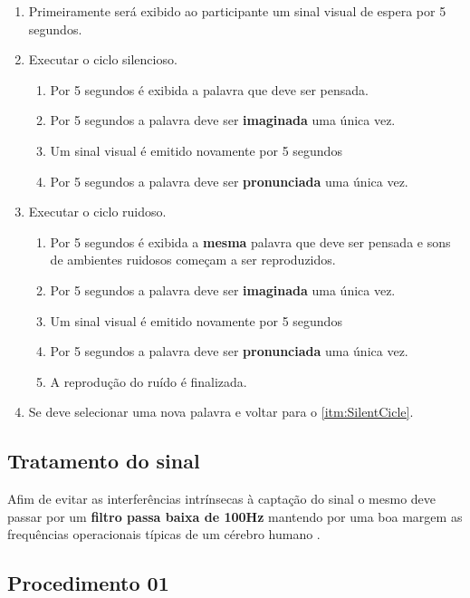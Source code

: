 			\begin{enumerate}
				\item Primeiramente será exibido ao participante um sinal visual de espera por 5 segundos.
				
				\item Executar o ciclo silencioso. \label{itm:SilentCicle}
				\begin{enumerate}
					\item Por 5 segundos é exibida a palavra que deve ser pensada. 
					\item Por 5 segundos a palavra deve ser \textbf{imaginada} uma única vez.
					\item Um sinal visual é emitido novamente por 5 segundos
					\item Por 5 segundos a palavra deve ser \textbf{pronunciada} uma única vez.
				\end{enumerate}
				
				\item Executar o ciclo ruidoso.
				\begin{enumerate}
					\item Por 5 segundos é exibida a \textbf{mesma} palavra que deve ser pensada e sons de ambientes ruidosos começam a ser reproduzidos.
					\item Por 5 segundos a palavra deve ser \textbf{imaginada} uma única vez.
					\item Um sinal visual é emitido novamente por 5 segundos
					\item Por 5 segundos a palavra deve ser \textbf{pronunciada} uma única vez.
					\item A reprodução do ruído é finalizada.
				\end{enumerate}
				
				\item Se deve selecionar uma nova palavra e voltar para o \autoref{itm:SilentCicle}.
			\end{enumerate}
		
		\subsection{Tratamento do sinal}
			\par Afim de evitar as interferências intrínsecas à captação do sinal o mesmo deve passar por um \textbf{filtro passa baixa de 100Hz} mantendo por uma boa margem as frequências operacionais típicas de um cérebro humano \cite{JALALYBIDGOLY2020101788}.

	\subsection{Procedimento 01}